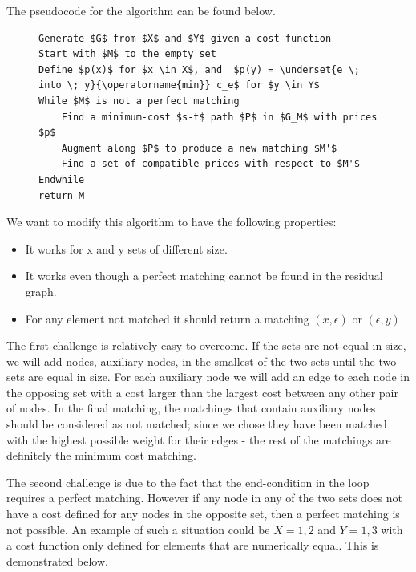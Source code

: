 \documentclass[11pt]{article}
\begin{document}
The pseudocode for the algorithm can be found below.

\begin{figure}
\begin{lstlisting}[mathescape]
Generate $G$ from $X$ and $Y$ given a cost function
Start with $M$ to the empty set
Define $p(x)$ for $x \in X$, and  $p(y) = \underset{e \; into \; y}{\operatorname{min}} c_e$ for $y \in Y$
While $M$ is not a perfect matching
    Find a minimum-cost $s-t$ path $P$ in $G_M$ with prices $p$
    Augment along $P$ to produce a new matching $M'$
    Find a set of compatible prices with respect to $M'$
Endwhile
return M
\end{lstlisting}
\end{figure}

We want to modify this algorithm to have the following properties:

\begin{itemize}
\item It works for x and y sets of different size. 
\item It works even though a perfect matching cannot be found in the residual graph.
\item For any element not matched it should return a matching $(x, \epsilon)$ or $(\epsilon, y)$
\end{itemize}

The first challenge is relatively easy to overcome. If the sets are not equal in size, we will add nodes, auxiliary nodes, in the smallest of the two sets until the two sets are equal in size. For each auxiliary node we will add an edge to each node in the opposing set with a cost larger than the largest cost between any other pair of nodes. In the final matching, the matchings that contain auxiliary nodes should be considered as not matched; since we chose they have been matched with the highest possible weight for their edges - the rest of the matchings are definitely the minimum cost matching.

The second challenge is due to the fact that the end-condition in the loop requires a perfect matching. However if any node in any of the two sets does not have a cost defined for any nodes in the opposite set, then a perfect matching is not possible. An example of such a situation could be $X={1, 2}$ and $Y={1, 3}$ with a cost function only defined for elements that are numerically equal. This is demonstrated below.
\end{document}
